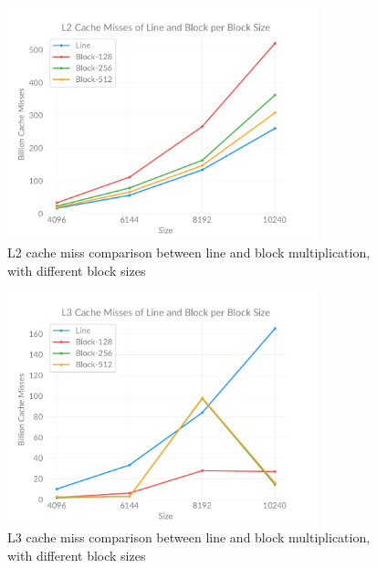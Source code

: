     \begin{figure}[ht]
        \centering
        \captionsetup{justification=centering, margin=2cm}
        \includegraphics[width=0.8\textwidth]{pdf/line-block-l2}
        \caption{L2 cache miss comparison between line and block multiplication, with different block sizes}
        \label{fig:chart:line-block-l2}
    \end{figure}

    \begin{figure}[ht]
        \centering
        \captionsetup{justification=centering, margin=2cm}
        \includegraphics[width=0.8\textwidth]{pdf/line-block-l3}
        \caption{L3 cache miss comparison between line and block multiplication, with different block sizes}
        \label{fig:chart:line-block-l3}
    \end{figure}

